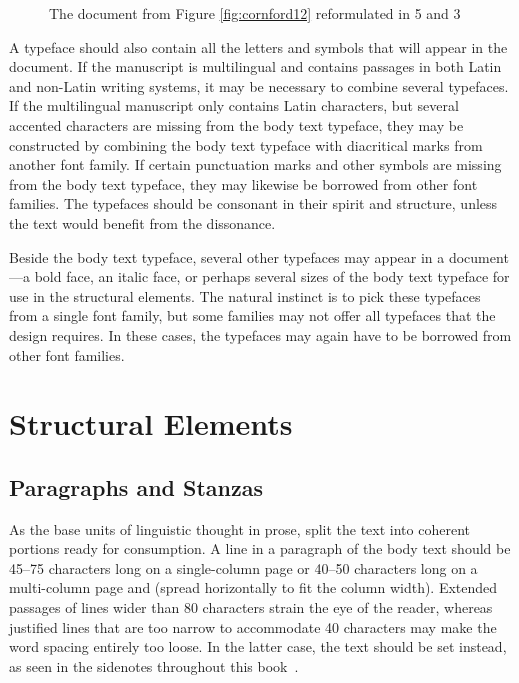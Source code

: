 \begin{figure}
  \caption{The document from Figure \ref{fig:cornford12} reformulated in
    5 and 3}
\end{figure}

A typeface should also contain all the letters and symbols that will appear in
the document. If the manuscript is multilingual and contains passages in both
Latin and non-Latin writing systems, it may be necessary to combine several
typefaces. If the multilingual manuscript only contains Latin characters, but
several accented characters are missing from the body text typeface, they may be
constructed by combining the body text typeface with diacritical marks from
another font family. If certain punctuation marks and other symbols are missing
from the body text typeface, they may likewise be borrowed from other font
families. The typefaces should be consonant in their spirit and structure,
unless the text would benefit from the
dissonance.~\cite[sec.\,5.1.2]{bringhurst92}

Beside the body text typeface, several other typefaces may appear in a
document---a bold face, an italic face, or perhaps several sizes of the body
text typeface for use in the structural elements. The natural instinct is to
pick these typefaces from a single font family, but some families may not offer
all typefaces that the design requires. In these cases, the typefaces may again
have to be borrowed from other font families.

\section{Structural Elements}
\subsection{Paragraphs and Stanzas}\label{sec:paragraphs}
As the base units of linguistic thought in prose,  split the
text into coherent portions ready for consumption. A line in a paragraph of the
body text should be 45--75 characters long on a single-column page or 40--50
characters long on a multi-column page and
(spread horizontally to fit the column width). Extended passages of lines wider
than 80 characters strain the eye of the reader, whereas justified lines that
are too narrow to accommodate 40 characters may make the word spacing entirely
too loose. In the latter case, the text should be set
 instead, as
seen in the sidenotes throughout this book~\cite[sec.\,2.1.2]{bringhurst92}.

